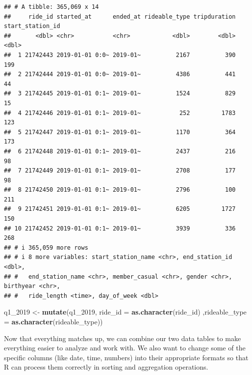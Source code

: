 \documentclass[
]{article}
\newenvironment{Shaded}{\begin{snugshade}}{\end{snugshade}}
\newcommand{\AttributeTok}[1]{\textcolor[rgb]{0.13,0.29,0.53}{#1}}
\newcommand{\FunctionTok}[1]{\textcolor[rgb]{0.13,0.29,0.53}{\textbf{#1}}}
\newcommand{\NormalTok}[1]{#1}
\newcommand{\OtherTok}[1]{\textcolor[rgb]{0.56,0.35,0.01}{#1}}
\begin{document}
\begin{verbatim}
## # A tibble: 365,069 x 14
##     ride_id started_at      ended_at rideable_type tripduration start_station_id
##       <dbl> <chr>           <chr>            <dbl>        <dbl>            <dbl>
##  1 21742443 2019-01-01 0:0~ 2019-01~          2167          390              199
##  2 21742444 2019-01-01 0:0~ 2019-01~          4386          441               44
##  3 21742445 2019-01-01 0:1~ 2019-01~          1524          829               15
##  4 21742446 2019-01-01 0:1~ 2019-01~           252         1783              123
##  5 21742447 2019-01-01 0:1~ 2019-01~          1170          364              173
##  6 21742448 2019-01-01 0:1~ 2019-01~          2437          216               98
##  7 21742449 2019-01-01 0:1~ 2019-01~          2708          177               98
##  8 21742450 2019-01-01 0:1~ 2019-01~          2796          100              211
##  9 21742451 2019-01-01 0:1~ 2019-01~          6205         1727              150
## 10 21742452 2019-01-01 0:1~ 2019-01~          3939          336              268
## # i 365,059 more rows
## # i 8 more variables: start_station_name <chr>, end_station_id <dbl>,
## #   end_station_name <chr>, member_casual <chr>, gender <chr>, birthyear <chr>,
## #   ride_length <time>, day_of_week <dbl>
\end{verbatim}

\begin{Shaded}
\begin{Highlighting}[]
\NormalTok{q1\_2019 }\OtherTok{\textless{}{-}} \FunctionTok{mutate}\NormalTok{(q1\_2019, }\AttributeTok{ride\_id =} \FunctionTok{as.character}\NormalTok{(ride\_id)}
\NormalTok{                  ,}\AttributeTok{rideable\_type =} \FunctionTok{as.character}\NormalTok{(rideable\_type))}
\end{Highlighting}
\end{Shaded}

Now that everything matches up, we can combine our two data tables to
make everything easier to analyze and work with. We also want to change
some of the specific columns (like date, time, numbers) into their
appropriate formats so that R can process them correctly in sorting and
aggregation operations.
\end{document}
